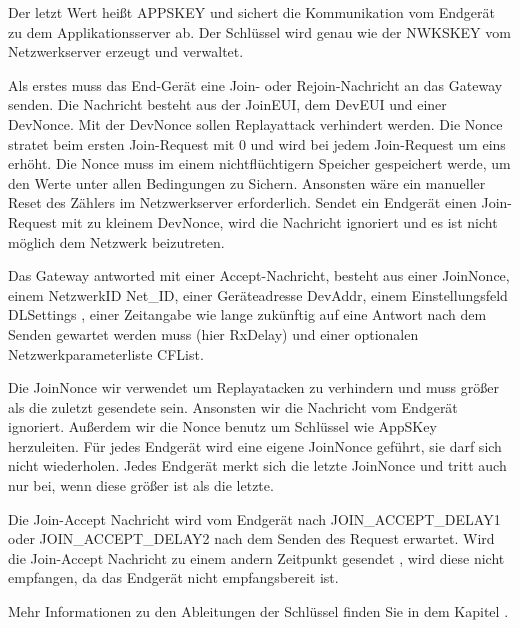 \documentclass[a4paper,12pt]{article}
\begin{document}
                Der letzt Wert heißt APPSKEY und sichert die Kommunikation vom Endgerät zu dem Applikationsserver ab. 
                Der Schlüssel wird genau wie der NWKSKEY vom Netzwerkserver erzeugt und verwaltet.\cite[S.3]{LoRaSecur}

                Als erstes muss das End-Gerät eine Join- oder Rejoin-Nachricht an das Gateway senden. Die Nachricht besteht aus der 
                JoinEUI, dem DevEUI und einer DevNonce. Mit der DevNonce sollen Replayattack verhindert werden. Die
                Nonce stratet beim ersten Join-Request mit 0 und wird bei jedem Join-Request um eins erhöht. 
                Die Nonce muss im einem nichtflüchtigern Speicher gespeichert werde, um den Werte unter allen Bedingungen 
                zu Sichern. Ansonsten wäre ein manueller Reset des Zählers im Netzwerkserver erforderlich.
                Sendet ein Endgerät einen Join-Request mit zu kleinem DevNonce, wird die Nachricht ignoriert und es 
                ist nicht möglich dem Netzwerk 
                beizutreten.

                Das Gateway antworted mit einer Accept-Nachricht, besteht aus einer JoinNonce, einem NetzwerkID Net\_ID, einer Geräteadresse DevAddr,
                einem Einstellungsfeld DLSettings , einer Zeitangabe wie lange zukünftig auf eine Antwort nach dem
                Senden gewartet werden muss (hier RxDelay) und einer optionalen Netzwerkparameterliste CFList.

                Die JoinNonce wir verwendet um Replayatacken zu verhindern und muss größer als die zuletzt 
                gesendete sein. Ansonsten wir die Nachricht vom Endgerät ignoriert. Außerdem wir die Nonce benutz 
                um Schlüssel wie 
                AppSKey herzuleiten. Für jedes Endgerät wird eine eigene JoinNonce geführt, sie darf sich nicht 
                wiederholen. Jedes Endgerät merkt sich die letzte JoinNonce und tritt auch nur bei, wenn diese größer 
                ist als die letzte.

                Die Join-Accept Nachricht wird vom Endgerät nach JOIN\_ACCEPT\_DELAY1 oder JOIN\_ACCEPT\_DELAY2 nach 
                dem Senden des Request erwartet. Wird die Join-Accept Nachricht zu einem andern Zeitpunkt gesendet 
                , wird diese nicht empfangen, da das Endgerät nicht empfangsbereit ist.

                Mehr Informationen zu den Ableitungen der Schlüssel finden Sie in dem Kapitel .
\end{document}
